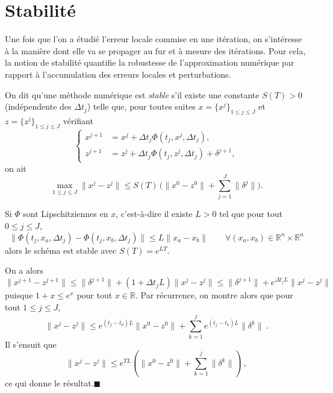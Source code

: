 \hypertarget{ed2-stabilituxe9}{%
\section{Stabilité}\label{ed2-stabilituxe9}}

Une fois que l'on a étudié l'erreur locale commise en une itération, on
s'intéresse à la manière dont elle va se propager au fur et à mesure des
itérations. Pour cela, la notion de stabilité quantifie la robustesse de
l'approximation numérique par rapport à l'accumulation des erreurs
locales et perturbations.

\hypertarget{ed2-def_stab}{}
\begin{definition}[Stabilité]\label{ed2-def_stab}
On dit qu'une méthode numérique est \emph{stable} s'il existe une
constante \(S(T) > 0\) (indépendente des \({\Delta t}_j\)) telle que,
pour toutes suites \(x = \{ x^j \}_{1 \leq j \leq J}\) et
\(z = \{ z^j \}_{1 \leq j \leq J}\) vérifiant \[
\left\{ \begin{aligned}
x^{j+1} & = x^j + {\Delta t}_j \Phi(t_j,x^j,{\Delta t}_j), \\
z^{j+1} & = z^j + {\Delta t}_j \Phi(t_j,z^j,{\Delta t}_j) + \delta^{j+1},
\end{aligned} \right.
\] on ait \[
\max_{1 \leq j \leq J} \| x^j - z^j\| \leq S(T) \, \Big( \|x^0 -z^0\| + \sum_{j = 1}^J  \|\delta^j\| \Big).
\]
\end{definition}

\hypertarget{ed2-theo_CS_stab}{}
\begin{theoreme}\label{ed2-theo_CS_stab}
Si \(\Phi\) sont Lipschitziennes en \(x\), c'est-à-dire il existe
\(L>0\) tel que pour tout \(0\leq j\leq J\), \[
\|\Phi(t_j,x_a,{\Delta t}_j)-\Phi(t_j,x_b,{\Delta t}_j)\|\leq L \|x_a-x_b\| \qquad \forall (x_a,x_b)\in \mathbb{R}^n \times \mathbb{R}^n
\] alors le schéma est stable avec \(S(T)=e^{L T}\).
\end{theoreme}

\hypertarget{ed2-duxe9monstration-2}{}
\begin{preuve}\label{ed2-duxe9monstration-2}
On a alors \[
\| x^{j+1} - z^{j+1} \| \leq  \| \delta^{j+1} \| + (1 + {\Delta t}_j L) \| x^{j} - z^{j} \| \leq \| \delta^{j+1} \| +  e^{{\Delta t}_j L} \| x^{j} - z^{j} \| 
\] puisque \(1+x \leq e^{x}\) pour tout \(x\in \mathbb{R}\). Par
récurrence, on montre alors que pour tout \(1\leq j \leq J\), \[
\| x^{j} - z^{j} \| \leq e^{(t_j-t_0) L} \|x^0 -z^0\| + \sum_{k=1}^j e^{(t_j-t_k)L} \| \delta^{k} \|  \ .
\] Il s'ensuit que \[
\| x^{j} - z^{j} \| \leq e^{TL}\left(\|x^0 -z^0\|+ \sum_{k=1}^j \| \delta^{k} \|\right) \ ,
\] ce qui donne le résultat.\hfill$\blacksquare$
\end{preuve}


